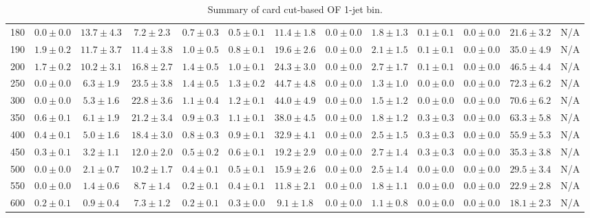 \begin{table}
{\begin{center}
\begin{tabular}{l | c c | c c c c c c c c  | c c}
180 & $0.0\pm0.0$ & $13.7\pm4.3$ & $7.2\pm2.3$ & $0.7\pm0.3$ & $0.5\pm0.1$ & $11.4\pm1.8$ & $0.0\pm0.0$ & $1.8\pm1.3$ & $0.1\pm0.1$ & $0.0\pm0.0$ & $21.6\pm3.2$ & N/A \\
190 & $1.9\pm0.2$ & $11.7\pm3.7$ & $11.4\pm3.8$ & $1.0\pm0.5$ & $0.8\pm0.1$ & $19.6\pm2.6$ & $0.0\pm0.0$ & $2.1\pm1.5$ & $0.1\pm0.1$ & $0.0\pm0.0$ & $35.0\pm4.9$ & N/A \\
200 & $1.7\pm0.2$ & $10.2\pm3.1$ & $16.8\pm2.7$ & $1.4\pm0.5$ & $1.0\pm0.1$ & $24.3\pm3.0$ & $0.0\pm0.0$ & $2.7\pm1.7$ & $0.1\pm0.1$ & $0.0\pm0.0$ & $46.5\pm4.4$ & N/A \\
250 & $0.0\pm0.0$ & $6.3\pm1.9$ & $23.5\pm3.8$ & $1.4\pm0.5$ & $1.3\pm0.2$ & $44.7\pm4.8$ & $0.0\pm0.0$ & $1.3\pm1.0$ & $0.0\pm0.0$ & $0.0\pm0.0$ & $72.3\pm6.2$ & N/A \\
300 & $0.0\pm0.0$ & $5.3\pm1.6$ & $22.8\pm3.6$ & $1.1\pm0.4$ & $1.2\pm0.1$ & $44.0\pm4.9$ & $0.0\pm0.0$ & $1.5\pm1.2$ & $0.0\pm0.0$ & $0.0\pm0.0$ & $70.6\pm6.2$ & N/A \\
350 & $0.6\pm0.1$ & $6.1\pm1.9$ & $21.2\pm3.4$ & $0.9\pm0.3$ & $1.1\pm0.1$ & $38.0\pm4.5$ & $0.0\pm0.0$ & $1.8\pm1.2$ & $0.3\pm0.3$ & $0.0\pm0.0$ & $63.3\pm5.8$ & N/A \\
400 & $0.4\pm0.1$ & $5.0\pm1.6$ & $18.4\pm3.0$ & $0.8\pm0.3$ & $0.9\pm0.1$ & $32.9\pm4.1$ & $0.0\pm0.0$ & $2.5\pm1.5$ & $0.3\pm0.3$ & $0.0\pm0.0$ & $55.9\pm5.3$ & N/A \\
450 & $0.3\pm0.1$ & $3.2\pm1.1$ & $12.0\pm2.0$ & $0.5\pm0.2$ & $0.6\pm0.1$ & $19.2\pm2.9$ & $0.0\pm0.0$ & $2.7\pm1.4$ & $0.3\pm0.3$ & $0.0\pm0.0$ & $35.3\pm3.8$ & N/A \\
500 & $0.0\pm0.0$ & $2.1\pm0.7$ & $10.2\pm1.7$ & $0.4\pm0.1$ & $0.5\pm0.1$ & $15.9\pm2.6$ & $0.0\pm0.0$ & $2.5\pm1.4$ & $0.0\pm0.0$ & $0.0\pm0.0$ & $29.5\pm3.4$ & N/A \\
550 & $0.0\pm0.0$ & $1.4\pm0.6$ & $8.7\pm1.4$ & $0.2\pm0.1$ & $0.4\pm0.1$ & $11.8\pm2.1$ & $0.0\pm0.0$ & $1.8\pm1.1$ & $0.0\pm0.0$ & $0.0\pm0.0$ & $22.9\pm2.8$ & N/A \\
600 & $0.2\pm0.1$ & $0.9\pm0.4$ & $7.3\pm1.2$ & $0.2\pm0.1$ & $0.3\pm0.0$ & $9.1\pm1.8$ & $0.0\pm0.0$ & $1.1\pm0.8$ & $0.0\pm0.0$ & $0.0\pm0.0$ & $18.1\pm2.3$ & N/A \\
\hline
\end{tabular}
\end{center}
}
\caption{Summary of card cut-based OF 1-jet bin.}
\end{table}
